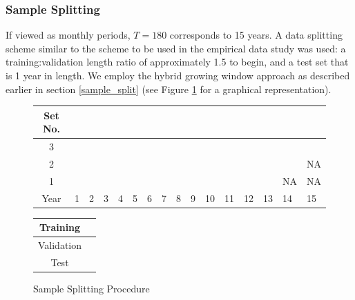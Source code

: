 \documentclass{article}
\begin{document}
\subsubsection{Sample Splitting}

If viewed as monthly periods, $T = 180$ corresponds to 15 years. A data splitting scheme similar to the scheme to be used in the empirical data study was used: a training:validation length ratio of approximately 1.5 to begin, and a test set that is 1 year in length. We employ the hybrid growing window approach as described earlier in section \ref{sample_split} (see Figure \ref{sample_split_diag} for a graphical representation).

\begin{figure}[!htb]
	\begin{center}
		\begin{tabular}{|c|p{0.30cm}p{0.30cm}p{0.30cm}p{0.30cm}p{0.30cm}p{0.30cm}p{0.30cm}p{0.30cm}p{0.30cm}p{0.30cm}p{0.30cm}p{0.30cm}p{0.30cm}p{0.30cm}p{0.30cm}|}
			\hline
			Set No. &&&&&&&&&&&&&&& \\
			\hline
			3 & \cellcolor{cyan} & \cellcolor{cyan} & \cellcolor{cyan} & \cellcolor{cyan} & \cellcolor{cyan} & \cellcolor{cyan} & \cellcolor{cyan} & \cellcolor{cyan} & \cellcolor{cyan} &
			\cellcolor{pink} & \cellcolor{pink} & \cellcolor{pink} & \cellcolor{pink} & \cellcolor{pink} & 	
			\cellcolor{olive} \\
			2 & \cellcolor{cyan} & \cellcolor{cyan} & \cellcolor{cyan} & \cellcolor{cyan} & \cellcolor{cyan} & \cellcolor{cyan} & \cellcolor{cyan} & \cellcolor{cyan} &
			\cellcolor{pink} & \cellcolor{pink} & \cellcolor{pink} & \cellcolor{pink} & \cellcolor{pink} & 	
			\cellcolor{olive} & NA  \\
			1 & \cellcolor{cyan} & \cellcolor{cyan} & \cellcolor{cyan} & \cellcolor{cyan} & \cellcolor{cyan} & \cellcolor{cyan} & \cellcolor{cyan} &
			\cellcolor{pink} & \cellcolor{pink} & \cellcolor{pink} & \cellcolor{pink} & \cellcolor{pink} & 	
			\cellcolor{olive} & NA & NA \\
			\hline
			Year & 1 & 2 & 3 & 4 & 5 & 6 & 7 & 8 & 9 & 10 & 11 & 12 & 13 & 14 & 15\\
			\hline
		\end{tabular}
		\medskip
		\begin{tabular}{|c|p{0.30cm}|}
			\hline
			Training & \cellcolor{cyan} \\
			\hline
			Validation & \cellcolor{pink} \\
			\hline
			Test & \cellcolor{olive} \\
			\hline
		\end{tabular}
	\end{center}
	\caption{Sample Splitting Procedure}
	\label{sample_split_diag}
\end{figure}
\end{document}
